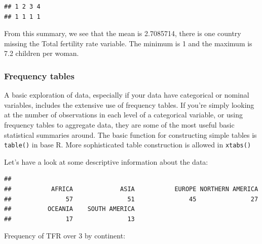 \documentclass[
]{article}
\newenvironment{Shaded}{\begin{snugshade}}{\end{snugshade}}
\newcommand{\CommentTok}[1]{\textcolor[rgb]{0.56,0.35,0.01}{\textit{#1}}}
\newcommand{\DecValTok}[1]{\textcolor[rgb]{0.00,0.00,0.81}{#1}}
\newcommand{\FunctionTok}[1]{\textcolor[rgb]{0.00,0.00,0.00}{#1}}
\newcommand{\NormalTok}[1]{#1}
\newcommand{\SpecialCharTok}[1]{\textcolor[rgb]{0.00,0.00,0.00}{#1}}
\begin{document}
\begin{verbatim}
## 1 2 3 4 
## 1 1 1 1
\end{verbatim}

From this summary, we see that the mean is
2.7085714, there is one country missing the Total
fertility rate variable. The minimum is 1 and the maximum is 7.2
children per woman.

\hypertarget{frequency-tables}{%
\subsubsection{Frequency tables}\label{frequency-tables}}

A basic exploration of data, especially if your data have categorical or
nominal variables, includes the extensive use of frequency tables. If
you're simply looking at the number of observations in each level of a
categorical variable, or using frequency tables to aggregate data, they
are some of the most useful basic statistical summaries around. The
basic function for constructing simple tables is \texttt{table()} in base R.
More sophisticated table construction is allowed in \texttt{xtabs()}

Let's have a look at some descriptive information about the data:

\begin{Shaded}
\end{Shaded}

\begin{verbatim}
## 
##           AFRICA             ASIA           EUROPE NORTHERN AMERICA 
##               57               51               45               27 
##          OCEANIA    SOUTH AMERICA 
##               17               13
\end{verbatim}

Frequency of TFR over 3 by continent:

\begin{Shaded}
\end{Shaded}
\end{document}
